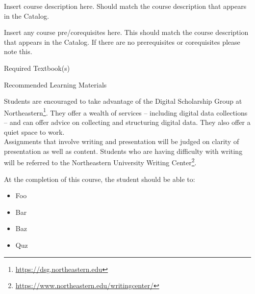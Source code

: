 \documentclass{neu_syllabus}
\date{Fall 2018}
\begin{document}
\begin{SyllabusHeader}
\instructor
{}
\end{SyllabusHeader}

Insert course description here.
Should match the course description that appears in the Catalog.

Insert any course pre/corequisites here.
This should match the course description that appears in the Catalog.
If there are no prerequisites or corequisites please note this.

\begin{SyllabusBooks}{Required Textbook(s)}
\end{SyllabusBooks}

\begin{SyllabusBooks}{Recommended Learning Materials}
\end{SyllabusBooks}

\newpage


Students are encouraged to take advantage of the Digital Scholarship Group at Northeastern\footnote{\url{https://dsg.northeastern.edu}}.
They offer a wealth of services -- including digital data collections -- and can offer advice on collecting and structuring digital data.
They also offer a quiet space to work.
\\

Assignments that involve writing and presentation will be judged on clarity of presentation as well as content.
Students who are having difficulty with writing will be referred to the Northeastern University Writing Center\footnote{\url{https://www.northeastern.edu/writingcenter/}}.


At the completion of this course, the student should be able to:
\begin{itemize}
\item Foo
\item Bar
\item Baz
\item Quz
\end{itemize}
\end{document}
